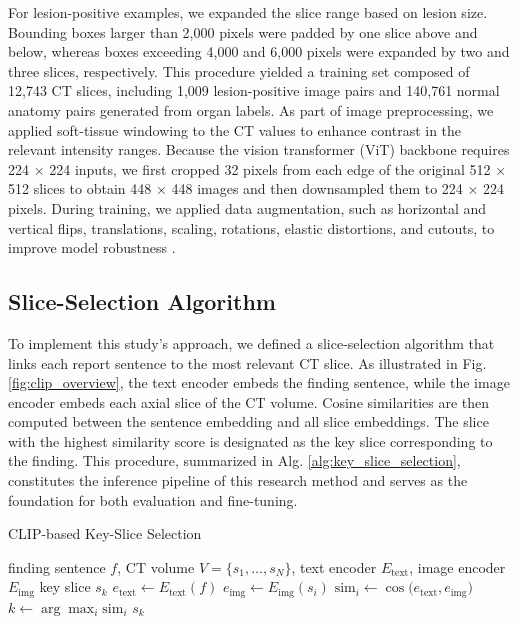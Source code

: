 \documentclass[bioengineering,article,submit,pdftex,moreauthors]{Definitions/mdpi}
\begin{document}
For lesion-positive examples, we expanded the slice range based on lesion size. Bounding boxes larger than 2,000 pixels were padded by one slice above and below, whereas boxes exceeding 4,000 and 6,000 pixels were expanded by two and three slices, respectively. 
This procedure yielded a training set composed of 12,743 CT slices, including 1,009 lesion-positive image pairs and 140,761 normal anatomy pairs generated from organ labels.
As part of image preprocessing, we applied soft-tissue windowing to the CT values to enhance contrast in the relevant intensity ranges. 
Because the vision transformer (ViT) backbone requires 224 × 224 inputs, we first cropped 32 pixels from each edge of the original 512 × 512 slices to obtain 448 × 448 images and then downsampled them to 224 × 224 pixels. 
During training, we applied data augmentation, such as horizontal and vertical flips, translations, scaling, rotations, elastic distortions, and cutouts, to improve model robustness \cite{devries_improved_2017}.


\subsection{Slice-Selection Algorithm}  

  To implement this study’s approach, we defined a slice-selection algorithm that links each report sentence to the most relevant CT slice. 
  As illustrated in Fig. \ref{fig:clip_overview}, the text encoder embeds the finding sentence, while the image encoder embeds each axial slice of the CT volume. 
  Cosine similarities are then computed between the sentence embedding and all slice embeddings. 
  The slice with the highest similarity score is designated as the key slice corresponding to the finding. 
  This procedure, summarized in Alg. \ref{alg:key_slice_selection}, constitutes the inference pipeline of this research method and serves as the foundation for both evaluation and fine-tuning.



\begin{algorithm}
  \caption{CLIP-based Key-Slice Selection}
  \label{alg:key_slice_selection}
  \begin{algorithmic}[1]
    \REQUIRE finding sentence $f$, CT volume $V = \{s_1, \dots, s_N\}$, text encoder $E_{\mathrm{text}}$, image encoder $E_{\mathrm{img}}$
    \ENSURE key slice $s_k$
    \STATE $e_{\mathrm{text}} \leftarrow E_{\mathrm{text}}(f)$ 
      \STATE $e_{\mathrm{img}} \leftarrow E_{\mathrm{img}}(s_i)$ 
      \STATE $\mathrm{sim}_i \leftarrow \cos\bigl(e_{\mathrm{text}}, e_{\mathrm{img}}\bigr)$ 
    \ENDFOR
    \STATE $k \leftarrow \arg\max_i \mathrm{sim}_i$ 
    \RETURN $s_k$
  \end{algorithmic}
\end{algorithm}
\end{document}
